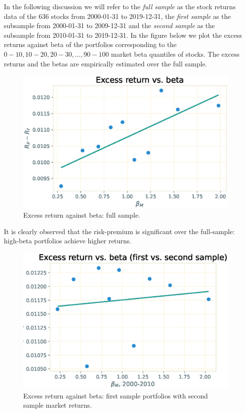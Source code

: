 \documentclass[10pt]{article}
\begin{document}
\begin{exercies}{2}
  In the following discussion we will refer to the \textit{full sample} as the
  stock returns data of the 636 stocks from 2000-01-31 to 2019-12-31, the
  \textit{first sample} as the subsample from 2000-01-31 to 2009-12-31 and the
  \textit{second sample} as the subsample from 2010-01-31 to 2019-12-31. In the
  figure below we plot the excess returns against beta of the portfolios corresponding to 
  the $0-10, 10-20, 20-30, \ldots, 90-100$ market beta quantiles of stocks. The excess
  returns and the betas are empirically estimated over the full sample.

  \begin{figure}[H]
    \centering
    \includegraphics[width=0.7\linewidth]{plot1.eps}
    \caption{Excess return against beta: full sample.}
  \end{figure}

  It is clearly observed that the risk-premium is significant over the
  full-sample: high-beta portfolios achieve higher returns.

  \begin{figure}[H]
    \centering
    \includegraphics[width=0.7\linewidth]{plot2.eps}
    \caption{Excess return against beta: first sample portfolios with second
      sample market returns.}
  \end{figure}


\end{exercies}
\end{document}
